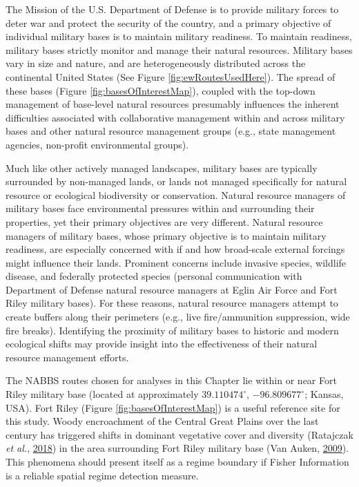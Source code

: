\documentclass[print]{nuthesis}
\begin{document}
The Mission of the U.S. Department of Defense is to provide military forces to deter war and protect the security of the country, and a primary objective of individual military bases is to maintain military readiness. To maintain readiness, military bases strictly monitor and manage their natural resources. Military bases vary in size and nature, and are heterogeneously distributed across the continental United States (See Figure \ref{fig:ewRoutesUsedHere}). The spread of these bases (Figure \ref{fig:basesOfInterestMap}), coupled with the top-down management of base-level natural resources presumably influences the inherent difficulties associated with collaborative management within and across military bases and other natural resource management groups (e.g., state management agencies, non-profit environmental groups).

Much like other actively managed landscapes, military bases are typically surrounded by non-managed lands, or lands not managed specifically for natural resource or ecological biodiversity or conservation. Natural resource managers of military bases face environmental pressures within and surrounding their properties, yet their primary objectives are very different. Natural resource managers of military bases, whose primary objective is to maintain military readiness, are especially concerned with if and how broad-scale external forcings might influence their lands. Prominent concerns include invasive species, wildlife disease, and federally protected species (personal communication with Department of Defense natural resource managers at Eglin Air Force and Fort Riley military bases). For these reasons, natural resource managers attempt to create buffers along their perimeters (e.g., live fire/ammunition suppression, wide fire breaks). Identifying the proximity of military bases to historic and modern ecological shifts may provide insight into the effectiveness of their natural resource management efforts.

The NABBS routes chosen for analyses in this Chapter lie within or near Fort Riley military base (located at approximately \(39.110474^{\circ}\), \(-96.809677^{\circ}\); Kansas, USA). Fort Riley (Figure \ref{fig:basesOfInterestMap}) is a useful reference site for this study. Woody encroachment of the Central Great Plains over the last century has triggered shifts in dominant vegetative cover and diversity (Ratajczak \emph{et al.}, \protect\hyperlink{ref-ratajczak2018abrupt}{2018}) in the area surrounding Fort Riley military base (Van Auken, \protect\hyperlink{ref-van2009causes}{2009}). This phenomena should present itself as a regime boundary if Fisher Information is a reliable spatial regime detection measure.
\end{document}
